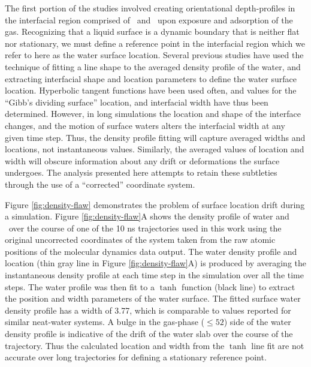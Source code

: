 	The first portion of the studies involved creating orientational depth-profiles in the interfacial region comprised of \suldiox~and \wat~upon exposure and adsorption of the gas. Recognizing that a liquid surface is a dynamic boundary that is neither flat nor stationary, we must define a reference point in the interfacial region which we refer to here as the water surface location. Several previous studies have used the technique of fitting a line shape to the averaged density profile of the water, and extracting interfacial shape and location parameters to define the water surface location.\cite{Shamay2010,Wick2006c,Chowdhary2006} Hyperbolic tangent functions have been used often, and values for the ``Gibb's dividing surface'' location, and interfacial width have thus been determined.\cite{Matsumoto1988} However, in long simulations the location and shape of the interface changes, and the motion of surface waters alters the interfacial width at any given time step. Thus, the density profile fitting will capture averaged widths and locations, not instantaneous values. Similarly, the averaged values of location and width will obscure information about any drift or deformations the surface undergoes. The analysis presented here attempts to retain these subtleties through the use of a ``corrected'' coordinate system.
	
Figure \ref{fig:density-flaw} demonstrates the problem of surface location drift during a simulation. Figure \ref{fig:density-flaw}A shows the density profile of water and \suldiox~over the course of one of the 10 ns trajectories used in this work using the original uncorrected coordinates of the system taken from the raw atomic positions of the molecular dynamics data output. The water density profile and location (thin gray line in Figure \ref{fig:density-flaw}A) is produced by averaging the instantaneous density profile at each time step in the simulation over all the time steps. The water profile was then fit to a $\tanh$ function (black line) to extract the position and width parameters of the water surface. The fitted surface water density profile has a width of 3.77\angs, which is comparable to values reported for similar neat-water systems.\cite{Dang1997,Hore2008} A bulge in the gas-phase ($\leq 52$\angs) side of the water density profile is indicative of the drift of the water slab over the course of the trajectory. Thus the calculated location and width from the $\tanh$ line fit are not accurate over long trajectories for defining a stationary reference point. 

